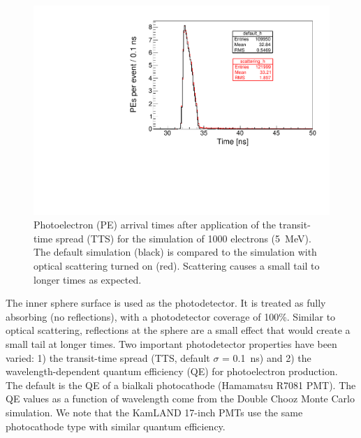 \documentclass[cits]{JINST}
\begin{document}
\begin{figure}
        \begin{center}
        \includegraphics[scale=0.4]{graphs2/Cerenkov_PEs_scattering_comparison.pdf}
        \caption[]{Photoelectron (PE) arrival times after application
        of the transit-time spread (TTS) for the simulation
        of 1000 electrons (5~MeV). The default simulation (black) is compared to the simulation with optical scattering turned on (red). Scattering causes a small tail to longer times as expected. \label{scattplot}}
        \end{center}
\end{figure}

The inner sphere surface is used as the photodetector. It is treated
as fully absorbing (no reflections), with a photodetector coverage of
100\%. Similar to optical scattering, reflections at the sphere are a small effect that would create a small tail at longer times. Two important photodetector properties have been varied: 1)
the transit-time spread (TTS, default $\sigma$ = 0.1~ns) and 2) the
wavelength-dependent quantum efficiency (QE) for photoelectron
production. The default is the QE of a bialkali photocathode (Hamamatsu
R7081 PMT)\cite{Hamamatsu_R7081}. The QE values as a function of wavelength come from the Double Chooz\cite{dctwo}
Monte Carlo simulation. We note that the KamLAND 17-inch PMTs use the
same photocathode type with similar quantum efficiency.
\end{document}
